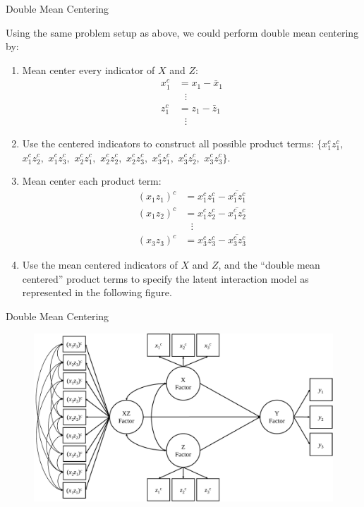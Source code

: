 \documentclass{beamer}
\newcommand{\vb}[0]{\vspace{6pt}}
\begin{document}
\begin{frame}[allowframebreaks]{Double Mean Centering}
  
  Using the same problem setup as above, we could perform double mean
  centering by:\\ 
  \vb
  \begin{enumerate}
  \item Mean center every indicator of $X$ and $Z$:
    \begin{align*}
      x_1^c &= x_1 - \bar{x}_1\\
      &~~~\vdots\\
      z_1^c &= z_1 - \bar{z}_1\\
      &~~~\vdots
    \end{align*}
  \item Use the centered indicators to construct all possible product
    terms: $\{x_1^cz_1^c,$ $x_1^cz_2^c,$ $x_1^cz_3^c,$ $x_2^cz_1^c,$
    $x_2^cz_2^c,$ $x_2^cz_3^c,$ $x_3^cz_1^c,$ $x_3^cz_2^c,$ $x_3^cz_3^c\}$.
    
    \pagebreak
    
  \item Mean center each product term:
    \begin{align*}
      (x_1z_1)^c &= x_1^cz_1^c - \overline{x_1^cz_1^c}\\
      (x_1z_2)^c &= x_1^cz_2^c - \overline{x_1^cz_2^c}\\
      &~~~\vdots\\
      (x_3z_3)^c &= x_3^cz_3^c - \overline{x_3^cz_3^c}
    \end{align*}
    \vb
  \item Use the mean centered indicators of $X$ and $Z$, and the
    ``double mean centered'' product terms to specify the latent
    interaction model as represented in the following figure.
  \end{enumerate}
  
\end{frame}


\begin{frame}{Double Mean Centering}
  
  \begin{figure}
    \includegraphics[width=\textwidth]{figures/dmcDiagram.pdf}
  \end{figure}
  
\end{frame}
\end{document}
